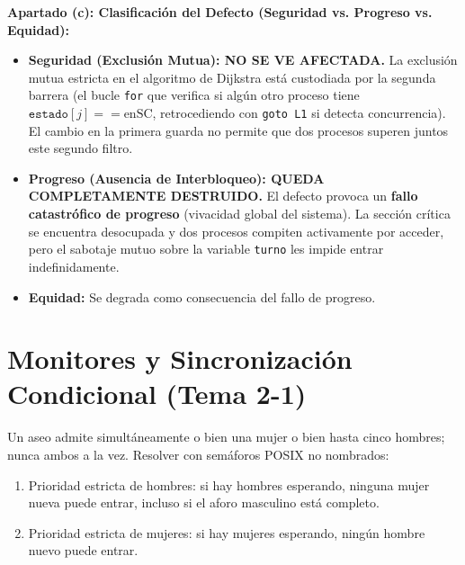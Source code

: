 \documentclass[11pt,a4paper,twoside,openright]{report}
\begin{document}
\begin{solucion}
\textbf{Apartado (c): Clasificación del Defecto (Seguridad vs. Progreso vs. Equidad):}\\
\begin{itemize}[leftmargin=*]
    \item \textbf{Seguridad (Exclusión Mutua): NO SE VE AFECTADA.}
    La exclusión mutua estricta en el algoritmo de Dijkstra está custodiada por la segunda barrera (el bucle \texttt{for} que verifica si algún otro proceso tiene $\texttt{estado}[j] == \text{enSC}$, retrocediendo con \texttt{goto L1} si detecta concurrencia). El cambio en la primera guarda no permite que dos procesos superen juntos este segundo filtro.
    \item \textbf{Progreso (Ausencia de Interbloqueo): QUEDA COMPLETAMENTE DESTRUIDO.}
    El defecto provoca un \textbf{fallo catastrófico de progreso} (vivacidad global del sistema). La sección crítica se encuentra desocupada y dos procesos compiten activamente por acceder, pero el sabotaje mutuo sobre la variable \texttt{turno} les impide entrar indefinidamente.
    \item \textbf{Equidad:} Se degrada como consecuencia del fallo de progreso.
\end{itemize}
\end{solucion}

\newpage

\chapter{Monitores y Sincronización Condicional (Tema 2-1)}
\label{bloque:monitores}


\begin{ejercicio}
Un aseo admite simultáneamente o bien una mujer o bien hasta cinco hombres; nunca ambos a la vez. Resolver con semáforos POSIX no nombrados:
\begin{enumerate}[label=(\alph*)]
    \item Prioridad estricta de hombres: si hay hombres esperando, ninguna mujer nueva puede entrar, incluso si el aforo masculino está completo.
    \item Prioridad estricta de mujeres: si hay mujeres esperando, ningún hombre nuevo puede entrar.
\end{enumerate}
\end{ejercicio}
\end{document}
